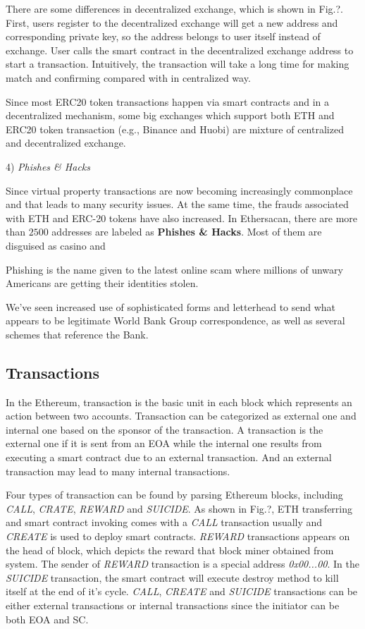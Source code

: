 There are some differences in decentralized exchange, which is shown in Fig.?. First, users register to the decentralized exchange will get a new address and corresponding private key, so the address belongs to user itself instead of exchange. User calls the smart contract in the decentralized exchange address to start a transaction. Intuitively, the transaction will take a long time for making match and confirming compared with in centralized way.

Since most ERC20 token transactions happen via smart contracts and in a decentralized mechanism, some big exchanges which support both ETH and ERC20 token transaction (e.g., Binance and Huobi) are mixture of centralized and decentralized exchange. 

4) \emph{Phishes \& Hacks}

Since virtual property transactions are now becoming increasingly commonplace and that leads to many security issues. At the same time, the frauds associated with ETH and ERC-20 tokens have also increased. In Ethersacan, there are more than $2500$ addresses are labeled as \textbf{Phishes \& Hacks}. Most of them are disguised as casino and 

Phishing is the name given to the latest online scam where millions of unwary Americans are getting their identities stolen.

We've seen increased use of sophisticated forms and letterhead to send what appears to be legitimate World Bank Group correspondence, as well as several schemes that reference the Bank.


\subsection{Transactions}
In the Ethereum, transaction is the basic unit in each block which represents an action between two accounts. Transaction can be categorized as external one and internal one based on the sponsor of the transaction. A transaction is the external one if it is sent from an EOA while the internal one results from executing a smart contract due to an external transaction. And an external transaction may lead to many internal transactions\cite{chen2018infocom}.

Four types of transaction can be found by parsing Ethereum blocks, including \emph{CALL}, \emph{CRATE}, \emph{REWARD} and \emph{SUICIDE}. As shown in Fig.?, ETH transferring and smart contract invoking comes with a \emph{CALL} transaction usually and \emph{CREATE} is used to deploy smart contracts. \emph{REWARD} transactions appears on the head of block, which depicts the reward that block miner obtained from system. The sender of \emph{REWARD} transaction is a special address \emph{0x00...00}. In the \emph{SUICIDE} transaction, the smart contract will execute destroy method to kill itself at the end of it's cycle. \emph{CALL}, \emph{CREATE} and \emph{SUICIDE} transactions can be either external transactions or internal transactions since the initiator can be both EOA and SC.


